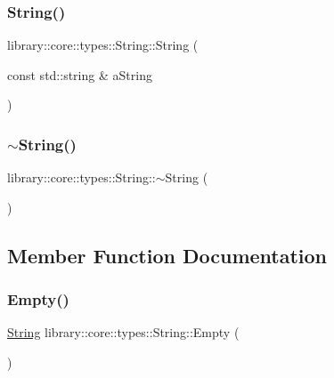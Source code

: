 \subsubsection{\texorpdfstring{String()}{String()}\hspace{0.1cm}{\footnotesize\ttfamily [2/2]}}
{\footnotesize\ttfamily library\+::core\+::types\+::\+String\+::\+String (\begin{DoxyParamCaption}\item[{const std\+::string \&}]{a\+String }\end{DoxyParamCaption})}

\mbox{\label{classlibrary_1_1core_1_1types_1_1String_a97f9b0024a58372a0281b25e2811f3bf}} 
\subsubsection{\texorpdfstring{$\sim$\+String()}{~String()}}
{\footnotesize\ttfamily library\+::core\+::types\+::\+String\+::$\sim$\+String (\begin{DoxyParamCaption}{ }\end{DoxyParamCaption})}



\subsection{Member Function Documentation}
\mbox{\label{classlibrary_1_1core_1_1types_1_1String_a4d359cb0dba46e14ca46f90e728c2b96}} 
\subsubsection{\texorpdfstring{Empty()}{Empty()}}
{\footnotesize\ttfamily \hyperlink{classlibrary_1_1core_1_1types_1_1String}{String} library\+::core\+::types\+::\+String\+::\+Empty (\begin{DoxyParamCaption}{ }\end{DoxyParamCaption})\hspace{0.3cm}{\ttfamily [static]}}

